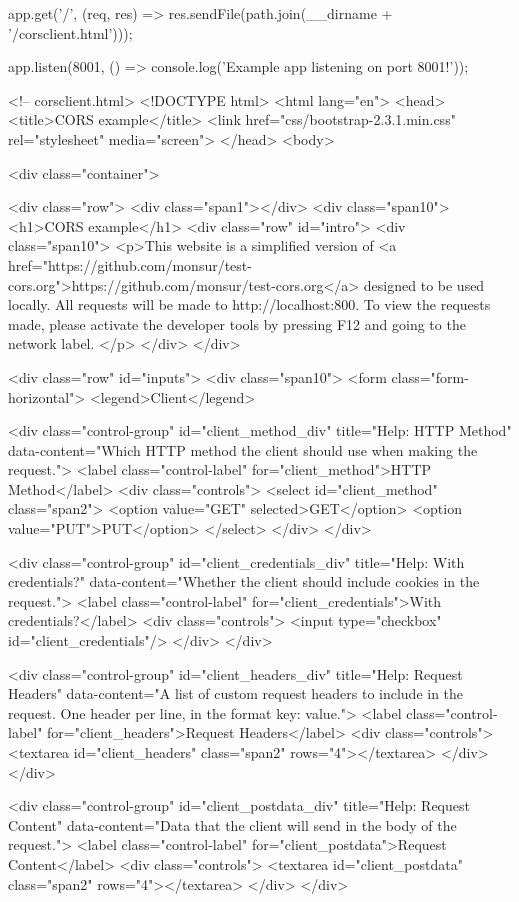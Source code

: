 \begin{Exercise}[label={websec-cors-practs}]
\begin{js}
app.get('/', (req, res) => res.sendFile(path.join(__dirname + '/corsclient.html')));

app.listen(8001, () => console.log('Example app listening on port 8001!'));
\end{js}

\begin{html}
<!-- corsclient.html>
<!DOCTYPE html>
<html lang="en">
<head>
<title>CORS example</title>
<link href="css/bootstrap-2.3.1.min.css" rel="stylesheet" media="screen">
</head>
<body>

<div class="container">

<div class="row">
<div class="span1"></div>
<div class="span10">
<h1>CORS example</h1>
<div class="row" id="intro">
<div class="span10">
<p>This website is a simplified version of <a href="https://github.com/monsur/test-cors.org">https://github.com/monsur/test-cors.org</a>
designed to be used locally.
All requests will be made to http://localhost:800. To view the requests made, please activate
the developer tools by pressing F12 and going to the network label.
</p>
</div>
</div>

<div class="row" id="inputs">
<div class="span10">
<form class="form-horizontal">
<legend>Client</legend>

<div class="control-group" id="client_method_div" title="Help: HTTP Method"
data-content="Which HTTP method the client should use when making the request.">
<label class="control-label" for="client_method">HTTP Method</label>
<div class="controls">
<select id="client_method" class="span2">
<option value="GET" selected>GET</option>
<option value="PUT">PUT</option>
</select>
</div>
</div>

<div class="control-group" id="client_credentials_div" title="Help: With credentials?"
data-content="Whether the client should include cookies in the request.">
<label class="control-label" for="client_credentials">With credentials?</label>
<div class="controls">
<input type="checkbox" id="client_credentials"/>
</div>
</div>

<div class="control-group" id="client_headers_div" title="Help: Request Headers"
data-content="A list of custom request headers to include in the request. One header per line, in the format key: value.">
<label class="control-label" for="client_headers">Request Headers</label>
<div class="controls">
<textarea id="client_headers" class="span2" rows="4"></textarea>
</div>
</div>

<div class="control-group" id="client_postdata_div" title="Help: Request Content"
data-content="Data that the client will send in the body of the request.">
<label class="control-label" for="client_postdata">Request Content</label>
<div class="controls">
<textarea id="client_postdata" class="span2" rows="4"></textarea>
</div>
</div>


\end{html}
\end{Exercise}
